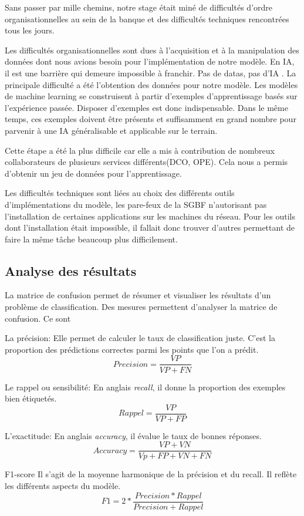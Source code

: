   Sans passer par mille chemins, notre stage était miné de difficultés 
  d’ordre organisationnelles au sein de la banque et des difficultés 
  techniques rencontrées tous les jours.

  Les difficultés organisationnelles sont dues à l'acquisition et à la
  manipulation des données dont nous avions besoin pour l'implémentation de
  notre modèle. En IA, il est une barrière qui demeure impossible à franchir.
  \og Pas de datas, pas d'IA \fg. La principale difficulté a été l'obtention
  des données pour notre modèle. Les  modèles de machine learning se 
  construisent à partir d'exemples d'apprentissage basés sur l'expérience 
  passée. Disposer d'exemples est donc indispensable. Dans le même temps, ces
  exemples doivent être présents et suffisamment en grand nombre pour parvenir à
  une IA généralisable et applicable sur le terrain.

 Cette étape a été la plus difficile car elle a mis à contribution de nombreux 
 collaborateurs de plusieurs services différents(DCO, OPE). Cela nous a permis
 d'obtenir un jeu de données pour l'apprentissage.

  Les difficultés techniques sont liées au choix des différents outils
  d'implémentations du modèle, les pare-feux de la SGBF n'autorisant pas 
  l'installation de certaines applications sur les machines du réseau. Pour les
  outils dont l'installation était impossible, il fallait donc trouver d'autres
  permettant de faire la même tâche beaucoup plus difficilement.

    \subsection{Analyse des résultats}
 La matrice de confusion permet de résumer et visualiser les résultats d'un
 problème de classification. Des mesures permettent d'analyser la matrice de 
 confusion. Ce sont
 \begin{description}
   \item{La précision}: Elle permet de calculer le taux de classification juste.
     C'est la proportion des prédictions correctes parmi les points que l'on a
     prédit.
     $$
     Precision = \frac{VP}{VP + FN}
     $$
   \item{Le rappel ou sensibilité: } En anglais \textit{recall}, il donne la proportion des
     exemples bien étiquetés.
     $$
     Rappel = \frac{VP}{VP + FP}
     $$
   \item{L'exactitude: } En anglais \textit{accuracy}, il évalue le taux de
     bonnes réponses.
     $$
     Accuracy = \frac{VP + VN} {Vp + FP + VN + FN}
     $$
   \item{F1-score} Il s'agit de la moyenne harmonique de la précision et du
     recall. Il reflète les différents aspects du modèle.
     $$
     F1 = 2 * \frac{Precision * Rappel}{Precision + Rappel}
     $$
 \end{description}
   

